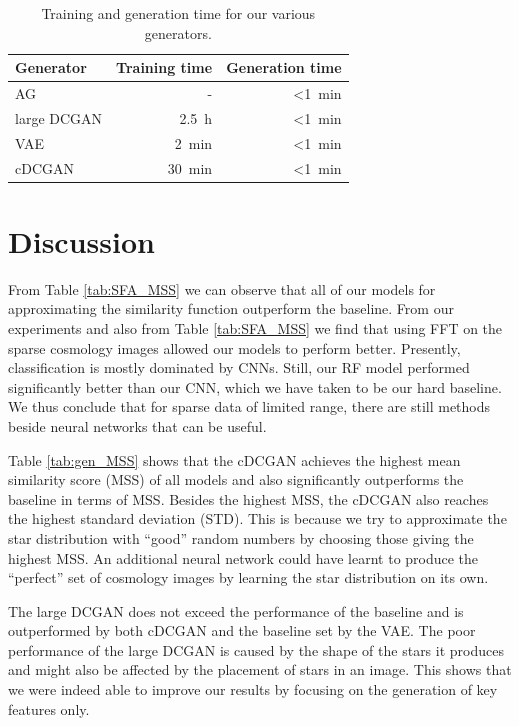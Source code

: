 \documentclass[10pt,conference,compsocconf]{IEEEtran}
\begin{document}
\begin{table}\centering
    \begin{tabular}{lrr}
    \toprule
        Generator   & Training time     & Generation time \\
    \midrule
        AG          & -                 & \SI{<1}{\minute} \\
        large DCGAN & \SI{2.5}{\hour}   & \SI{<1}{\minute} \\
        VAE         & \SI{2}{\minute}   & \SI{<1}{\minute} \\
        cDCGAN      & \SI{30}{\minute}  & \SI{<1}{\minute} \\
    \bottomrule
    \end{tabular}
\caption{Training and generation time for our various generators.}
\label{tab:gen_time}
\end{table}

\section{Discussion}

From Table \ref{tab:SFA_MSS} we can observe that all of our models for approximating the similarity function outperform the baseline. From our experiments and also from Table \ref{tab:SFA_MSS} we find that using FFT on the sparse cosmology images allowed our models to perform better. Presently, classification is mostly dominated by CNNs. Still, our RF model performed significantly better than our CNN, which we have taken to be our hard baseline. We thus conclude that for sparse data of limited range, there are still methods beside neural networks that can be useful. 

Table \ref{tab:gen_MSS} shows that the cDCGAN achieves the highest mean similarity score (MSS) of all models and also significantly outperforms the baseline in terms of MSS. Besides the highest MSS, the cDCGAN also reaches the highest standard deviation (STD). This is because we try to approximate the star distribution with ``good'' random numbers by choosing those giving the highest MSS. An additional neural network could have learnt to produce the ``perfect'' set of cosmology images by learning the star distribution on its own. %

The large DCGAN does not exceed the performance of the baseline and is outperformed by both cDCGAN and the baseline set by the VAE. The poor performance of the large DCGAN is caused by the shape of the stars it produces and might also be affected by the placement of stars in an image. This shows that we were indeed able to improve our results by focusing on the generation of key features only.
\end{document}
